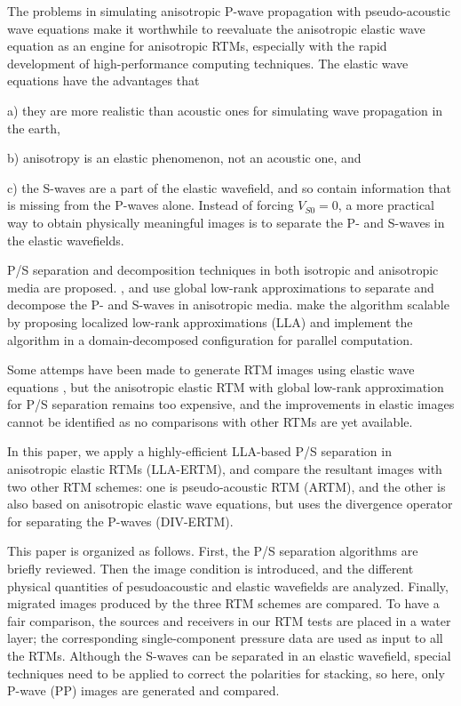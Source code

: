\documentclass[manuscript,ulem,graphix,revised]{geophysics}
\begin{document}
The problems in simulating anisotropic P-wave propagation with pseudo-acoustic wave equations make it worthwhile to reevaluate the anisotropic elastic wave equation as an engine for anisotropic RTMs, especially with the rapid development of high-performance computing techniques. The elastic wave equations have the advantages that

\begin{hangparas}{.23in}{1}
a) they are more realistic than acoustic ones for simulating wave propagation in the earth,

b) anisotropy is an elastic phenomenon, not an acoustic one, and

c) the S-waves are a part of the elastic wavefield, and so contain information that is missing from the P-waves alone. Instead of forcing $V_{S0}=0$, a more practical way to obtain physically meaningful images is to separate the P- and S-waves in the elastic wavefields. 
\end{hangparas}

P/S separation and decomposition techniques in both isotropic \citep{morse53, sun99, wenlong15} and anisotropic \citep{dellinger90,zhang10} media are proposed. \citet{cheng14}, \citet{cheng16} and \citet{Sripanich16} use global low-rank approximations to separate and decompose the P- and S-waves in anisotropic media. \citet{wenlong18} make the algorithm scalable by proposing localized low-rank approximations (LLA) and implement the algorithm in a domain-decomposed configuration for parallel computation.

Some attemps have been made to generate RTM images using elastic wave equations \citep{yan07,wenlong15b,wang16}, but the anisotropic elastic RTM with global low-rank approximation for P/S separation remains too expensive, and the improvements in elastic images cannot be identified as no comparisons with other RTMs are yet available.

In this paper, we  apply a highly-efficient LLA-based P/S separation in anisotropic elastic RTMs (LLA-ERTM), and compare the resultant images with two other RTM schemes: one is pseudo-acoustic RTM (ARTM), and the other is also based on anisotropic elastic wave equations, but uses the divergence operator for separating the P-waves (DIV-ERTM). 

This paper is organized as follows. First, the P/S separation algorithms are briefly reviewed. Then the image condition is introduced, and the different physical quantities of pesudoacoustic and elastic wavefields are analyzed. Finally, migrated images produced by the three RTM schemes are compared. 
To have a fair comparison, the sources and receivers in our RTM tests are placed in a water layer; the corresponding single-component pressure data are used as input to all the RTMs. Although the S-waves can be separated in an elastic wavefield, special techniques need to be applied to correct the polarities for stacking, so here, only P-wave (PP) images are generated and compared.
\end{document}
